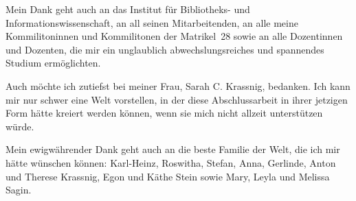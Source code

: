 Mein Dank geht auch an das Institut für Bibliotheks- und Informationswissenschaft, an all seinen Mitarbeitenden, an alle meine Kommilitoninnen und Kommilitonen der Matrikel~28 sowie an alle Dozentinnen und Dozenten, die mir ein unglaublich abwechslungsreiches und spannendes Studium ermöglichten.

Auch möchte ich zutiefst bei meiner Frau, Sarah C. Krassnig, bedanken.
Ich kann mir nur schwer eine Welt vorstellen, in der diese Abschlussarbeit in ihrer jetzigen Form hätte kreiert werden können, wenn sie mich nicht allzeit unterstützen würde.\enlargethispage{\baselineskip}

Mein ewigwährender Dank geht auch an die beste Familie der Welt, die ich mir hätte wünschen können: Karl-Heinz, Roswitha, Stefan, Anna, Gerlinde, Anton und Therese Krassnig, Egon und Käthe Stein sowie Mary, Leyla und Melissa Sagin.